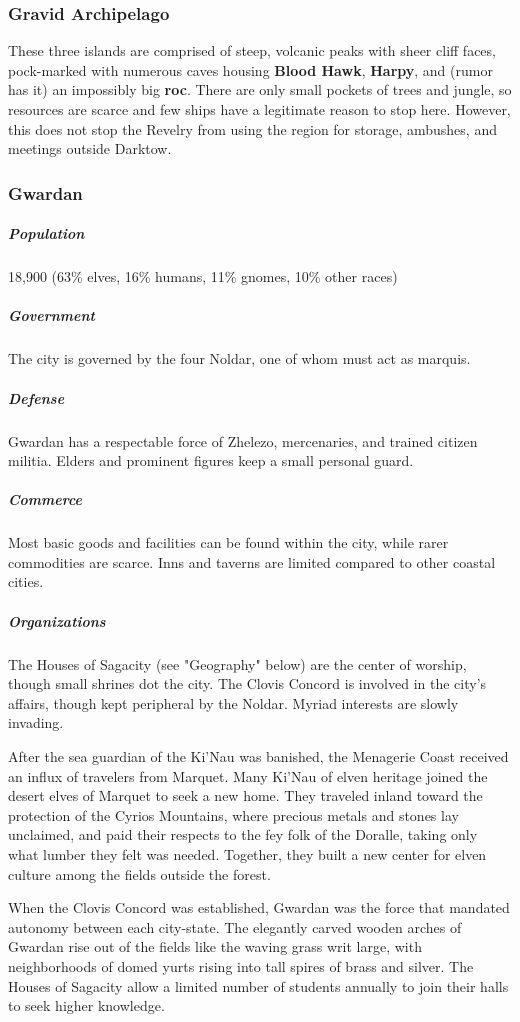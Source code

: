 \documentclass[10pt,a4paper,twoside,bg=print,twocolumn,openany,nodeprecatedcode]{dndbook}
\begin{document}
\subsubsection{Gravid Archipelago}
These three islands are comprised of steep, volcanic peaks with sheer cliff faces, pock-marked with numerous caves housing \textbf{Blood Hawk}, \textbf{Harpy}, and (rumor has it) an impossibly big \textbf{roc}. There are only small pockets of trees and jungle, so resources are scarce and few ships have a legitimate reason to stop here. However, this does not stop the Revelry from using the region for storage, ambushes, and meetings outside Darktow.

\subsubsection{Gwardan}
\subparagraph{Population}
18,900 (63\% elves, 16\% humans, 11\% gnomes, 10\% other races)

\subparagraph{Government}
The city is governed by the four Noldar, one of whom must act as marquis.

\subparagraph{Defense}
Gwardan has a respectable force of Zhelezo, mercenaries, and trained citizen militia. Elders and prominent figures keep a small personal guard.

\subparagraph{Commerce}
Most basic goods and facilities can be found within the city, while rarer commodities are scarce. Inns and taverns are limited compared to other coastal cities.

\subparagraph{Organizations}
The Houses of Sagacity (see "Geography" below) are the center of worship, though small shrines dot the city. The Clovis Concord is involved in the city's affairs, though kept peripheral by the Noldar. Myriad interests are slowly invading.

After the sea guardian of the Ki'Nau was banished, the Menagerie Coast received an influx of travelers from Marquet. Many Ki'Nau of elven heritage joined the desert elves of Marquet to seek a new home. They traveled inland toward the protection of the Cyrios Mountains, where precious metals and stones lay unclaimed, and paid their respects to the fey folk of the Doralle, taking only what lumber they felt was needed. Together, they built a new center for elven culture among the fields outside the forest.

When the Clovis Concord was established, Gwardan was the force that mandated autonomy between each city-state. The elegantly carved wooden arches of Gwardan rise out of the fields like the waving grass writ large, with neighborhoods of domed yurts rising into tall spires of brass and silver. The Houses of Sagacity allow a limited number of students annually to join their halls to seek higher knowledge.
\end{document}
